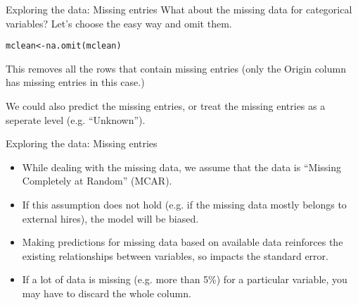 \documentclass{beamer}\usepackage[]{graphicx}\usepackage[]{color}
\makeatletter
\newcommand{\hlopt}[1]{\textcolor[rgb]{1,0.894,0.769}{#1}}%
\newcommand{\hlstd}[1]{\textcolor[rgb]{1,0.894,0.769}{#1}}%
\newcommand{\hlkwb}[1]{\textcolor[rgb]{0.804,0.776,0.451}{#1}}%
\newcommand{\hlkwc}[1]{\textcolor[rgb]{0.78,0.941,0.545}{#1}}%
\newcommand{\hlkwd}[1]{\textcolor[rgb]{1,0.78,0.769}{#1}}%
\newenvironment{kframe}{%
 \def\at@end@of@kframe{}%
 \ifinner\ifhmode%
  \def\at@end@of@kframe{\end{minipage}}%
  \begin{minipage}{\columnwidth}%
 \fi\fi%
 \def\FrameCommand##1{\hskip\@totalleftmargin \hskip-\fboxsep
 \colorbox{shadecolor}{##1}\hskip-\fboxsep
     \hskip-\linewidth \hskip-\@totalleftmargin \hskip\columnwidth}%
 \MakeFramed {\advance\hsize-\width
   \@totalleftmargin\z@ \linewidth\hsize
   \@setminipage}}%
 {\par\unskip\endMakeFramed%
 \at@end@of@kframe}
\newenvironment{knitrout}{}{} %
\makeatother
\begin{document}
\begin{darkframes}

    \begin{frame}[fragile]{Exploring the data: Missing entries}
      What about the missing data for categorical variables? \pause
      Let's choose the easy way and omit them.

\begin{knitrout}
\begin{kframe}
\begin{alltt}
\hlstd{mclean} \hlkwb{<-} \hlkwd{na.omit}\hlstd{(mclean)}
\end{alltt}
\end{kframe}
\end{knitrout}
      \pause
      This removes all the rows that contain missing entries (only the Origin column has missing entries in this case.) \pause \bigskip

      We could also predict the missing entries, or treat the missing entries as a seperate level (e.g. ``Unknown'').
    \end{frame}

    \begin{frame}[fragile]{Exploring the data: Missing entries}
      \begin{itemize}[<+->]
        \item While dealing with the missing data, we assume that the data is ``Missing Completely at Random'' (MCAR).
        \item If this assumption does not hold (e.g. if the missing data mostly belongs to external hires), the model will  be biased.
        \item Making predictions for missing data based on available data reinforces the existing relationships between variables, so impacts the standard error.
        \item If a lot of data is missing (e.g. more than 5\%) for a particular variable, you may have to discard the whole column.
      \end{itemize}
    \end{frame}


\end{darkframes}
\end{document}
